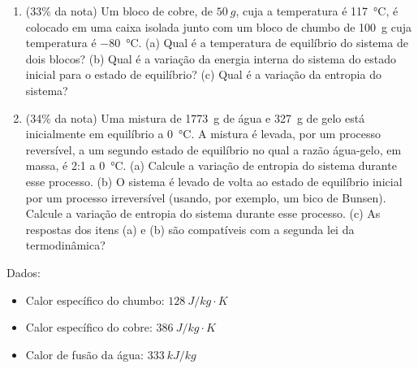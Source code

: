 \documentclass[12pt,a4paper,brazilian, fleqn]{article}
\newcommand{\ratio}[1]{(#1\% da nota)}
\begin{document}
\begin{enumerate}
    \item \ratio{33} Um bloco de cobre, de \(\SI{50}{g}\), cuja a temperatura é 
        \SI{117}{\celsius}, é colocado em uma caixa isolada junto com um bloco de chumbo de 
        \SI{100}{g} cuja temperatura é \SI{-80}{\celsius}. (a) Qual é a temperatura de equilíbrio
        do sistema de dois blocos? (b) Qual é a variação da energia interna do sistema 
        do estado inicial para o estado de equilíbrio? (c) Qual é a variação da 
        entropia do sistema?

    \item \ratio{34} Uma mistura de \SI{1773}{g} de água e \SI{327}{g} de gelo
        está inicialmente em equilíbrio a \SI{0}{\celsius}. A mistura é levada,
        por um processo reversível, a um segundo estado de equilíbrio no qual a 
        razão água-gelo, em massa, é 2:1 a \SI{0}{\celsius}. (a) Calcule a variação 
        de entropia do sistema durante esse processo. (b) O sistema é levado de volta
        ao estado de equilíbrio inicial por um processo irreversível (usando, por
        exemplo, um bico de Bunsen). Calcule a variação de entropia do sistema durante
        esse processo. (c) As respostas dos itens (a) e (b) são compatíveis com a 
        segunda lei da termodinâmica?

\end{enumerate}

Dados:
\begin{itemize}
    \item Calor específico do chumbo: \(\SI{128}{J/kg\cdot K}\)
    \item Calor específico do cobre: \(\SI{386}{J/kg\cdot K}\)
    \item Calor de fusão da água: \(\SI{333}{kJ/kg}\)
\end{itemize}
\end{document}
